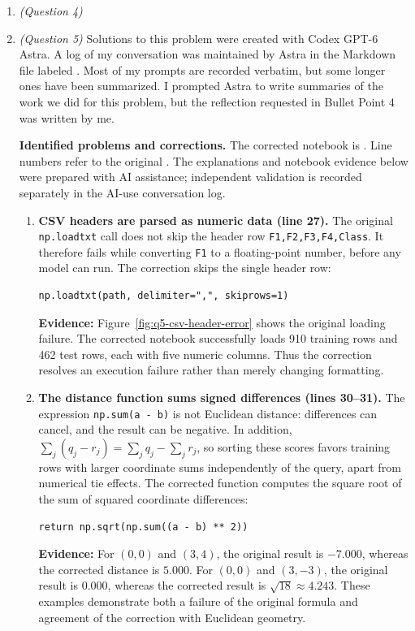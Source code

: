 \documentclass[12pt]{article}
\begin{document}
\begin{enumerate}
\item \emph{(Question 4)} 

\item \emph{(Question 5)} Solutions to this problem were created with Codex GPT-6 Astra. A log of my conversation was maintained by Astra in the Markdown file labeled . Most of my prompts
are recorded verbatim, but some longer ones have been summarized. I prompted Astra to write summaries of the work we did for this problem, but the reflection requested in Bullet Point 4 was written by me. 
\par\medskip
\noindent\textbf{Identified problems and corrections.}
The corrected notebook is .
Line numbers refer to the original .
The explanations and notebook evidence below were prepared with AI assistance;
independent validation is recorded separately in the AI-use conversation log.

\begin{enumerate}[label=\alph*.]
    \item \textbf{CSV headers are parsed as numeric data (line 27).}
    The original \texttt{np.loadtxt} call does not skip the header row
    \texttt{F1,F2,F3,F4,Class}. It therefore fails while converting
    \texttt{F1} to a floating-point number, before any model can run.
    The correction skips the single header row:
\begin{lstlisting}
np.loadtxt(path, delimiter=",", skiprows=1)
\end{lstlisting}
    \textbf{Evidence:} Figure~\ref{fig:q5-csv-header-error} shows the original
    loading failure. The corrected notebook successfully loads 910 training
    rows and 462 test rows, each with five numeric columns. Thus the correction
    resolves an execution failure rather than merely changing formatting.

    \item \textbf{The distance function sums signed differences (lines 30--31).}
    The expression \texttt{np.sum(a - b)} is not Euclidean distance:
    differences can cancel, and the result can be negative.
    In addition, $\sum_j(q_j-r_j)=\sum_j q_j-\sum_j r_j$, so sorting these
    scores favors training rows with larger coordinate sums independently
    of the query, apart from numerical tie effects.
    The corrected function computes the square root of the sum of squared
    coordinate differences:
\begin{lstlisting}
return np.sqrt(np.sum((a - b) ** 2))
\end{lstlisting}
    \textbf{Evidence:} For $(0,0)$ and $(3,4)$, the original result is
    $-7.000$, whereas the corrected distance is $5.000$. For $(0,0)$ and
    $(3,-3)$, the original result is $0.000$, whereas the corrected result is
    $\sqrt{18}\approx4.243$. These examples demonstrate both a failure of
    the original formula and agreement of the correction with Euclidean geometry.


\end{enumerate}
\end{enumerate}
\end{document}
